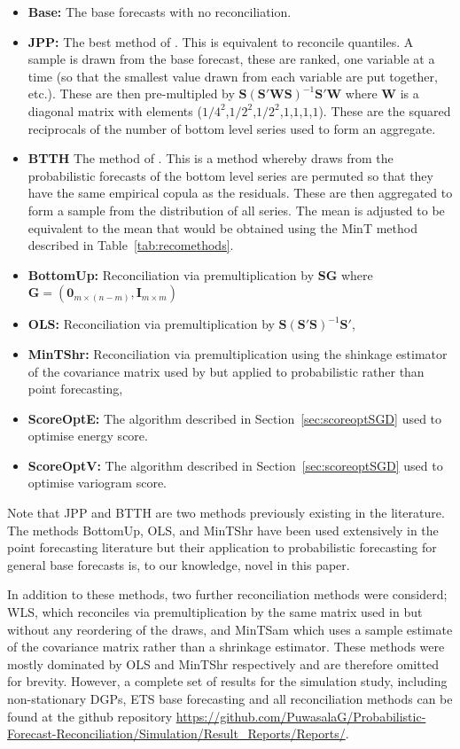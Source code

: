 \documentclass[12pt]{article}
\theoremstyle{definition}
\begin{document}
\begin{itemize}
	\item \textbf{Base:} The base forecasts with no reconciliation.
	\item \textbf{JPP:} The best method of \cite{JeoEtAl2019}.  This is equivalent to reconcile quantiles.  A sample is drawn from the base forecast, these are ranked, one variable at a time (so that the smallest value drawn from each variable are put together, etc.).  These are then pre-multipled by $\bm{S}\left(\bm{S}'\bm{W}\bm{S}\right)^{-1}\bm{S}'\bm{W}$ where $\bm{W}$ is a diagonal matrix with elements ($1/4^2$,$1/2^2$,$1/2^2$,$1$,$1$,$1$,$1$).  These are the squared reciprocals of the number of bottom level series used to form an aggregate.
	\item \textbf{BTTH} The method of \cite{Taieb2017}.  This is a method whereby draws from the probabilistic forecasts of the bottom level series are permuted so that they have the same empirical copula as the residuals.  These are then aggregated to form a sample from the distribution of all series.  The mean is adjusted to be equivalent to the mean that would be obtained using the MinT method \cite{WicEtAl2019} described in Table~\ref{tab:recomethods}. 
	\item \textbf{BottomUp:} Reconciliation via premultiplication by $\bm{S}\bm{G}$ where $\bm{G}=\left(\bm{0}_{m\times(n-m)},\bm{I}_{m\times m}\right)$ 
	\item \textbf{OLS:} Reconciliation via premultiplication by $\bm{S}\left(\bm{S}'\bm{S}\right)^{-1}\bm{S}'$,
	\item \textbf{MinTShr:} Reconciliation via premultiplication using the shinkage estimator of the covariance matrix used by \cite{WicEtAl2019} but applied to probabilistic rather than point forecasting,
	\item \textbf{ScoreOptE:} The algorithm described in Section~\ref{sec:scoreoptSGD} used to optimise energy score.
	\item \textbf{ScoreOptV:} The algorithm described in Section~\ref{sec:scoreoptSGD} used to optimise variogram score.
\end{itemize}

Note that JPP and BTTH are two methods previously existing in the literature. The methods BottomUp, OLS, and MinTShr have been used extensively in the point forecasting literature but their application to probabilistic forecasting for general base forecasts is, to our knowledge, novel in this paper.

In addition to these methods, two further reconciliation methods were considerd; WLS, which reconciles via premultiplication by the same matrix used in \cite{JeoEtAl2019} but without any reordering of the draws, and MinTSam which uses a sample estimate of the covariance matrix rather than a shrinkage estimator.  These methods were mostly dominated by OLS and MinTShr respectively and are therefore omitted for brevity.  However, a complete set of results for the simulation study, including non-stationary DGPs, ETS base forecasting and all reconciliation methods can be found at the github repository \url{https://github.com/PuwasalaG/Probabilistic-Forecast-Reconciliation/Simulation/Result_Reports/Reports/}.
\end{document}
